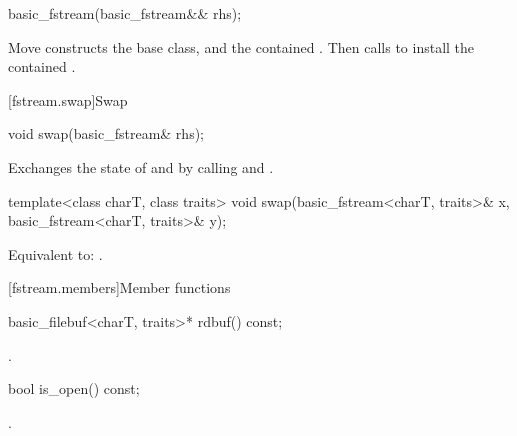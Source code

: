 %
\begin{itemdecl}
basic_fstream(basic_fstream&& rhs);
\end{itemdecl}

\begin{itemdescr}
\pnum
\effects
Move constructs the base class, and the contained .
Then calls 
to install the contained .
\end{itemdescr}

[fstream.swap]{Swap}

%
\begin{itemdecl}
void swap(basic_fstream& rhs);
\end{itemdecl}

\begin{itemdescr}
\pnum
\effects
Exchanges the state of 
and  by calling
 and
.
\end{itemdescr}

%
\begin{itemdecl}
template<class charT, class traits>
  void swap(basic_fstream<charT, traits>& x,
            basic_fstream<charT, traits>& y);
\end{itemdecl}

\begin{itemdescr}
\pnum
\effects
Equivalent to: .
\end{itemdescr}

[fstream.members]{Member functions}

%
\begin{itemdecl}
basic_filebuf<charT, traits>* rdbuf() const;
\end{itemdecl}

\begin{itemdescr}
\pnum
\returns
{}.
\end{itemdescr}

%
\begin{itemdecl}
bool is_open() const;
\end{itemdecl}

\begin{itemdescr}
\pnum
\returns
{}.
\end{itemdescr}

